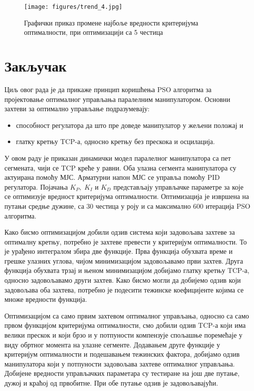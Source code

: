 \documentclass[12pt]{article}
\begin{document}
\begin{figure}[H]
    \centering
    \texttt{[image: figures/trend\_4.jpg]}
    \caption{Графички приказ промене најбоље вредности критеријума оптималности, при оптимизацији са 5 честица}
    \label{fig:trend_4}
\end{figure}
\newpage

\section{Закључак}
Циљ овог рада је да прикаже принцип коришћења PSO алгоритма за пројектовање оптималног управљања паралелним манипулатором. Основни захтеви за оптимално управљање подразумевају:
\begin{itemize}
    \item способност регулатора да што пре доведе манипулатор у жељени положај и
    \item глатку кретњу TCP-а, односно кретњу без прескока и осцилација.
\end{itemize}

У овом раду је приказан динамички модел паралелног манипулатора са пет сегмената, чији се TCP креће у равни. Оба улазна сегмента манипулатора су актуирана помоћу МЈС. Арматурни напон МЈС се управља помоћу PID регулатора. Појачања $K_P, \; K_I $ и $ K_D$ представљају управљачке параметре за које се оптимизује вредност критеријума оптималности. Оптимизација је извршена на путањи средње дужине, са 30 честица у роју и са максимално 600 итерација PSO алгоритма.

Како бисмо оптимизацијом добили одзив система који задовољава захтеве за оптималну кретњу, потребно је захтеве превести у критеријум оптималности. То је урађено интегралом збира две функције. Прва функција обухвата време и грешке улазних углова, чијом минимизацијом задовољавамо први захтев. Друга функција обухвата трзај и њеном минимизацијом добијамо глатку кретњу TCP-а, односно задовољавамо други захтев. Како бисмо могли да добијемо одзив који задовољава оба захтева, потребно је подесити тежинске коефицијенте којима се множе вредности функција.

Оптимизацијом са само првим захтевом оптималног управљања, односно са само првом функцијом критеријума оптималности, смо добили одзив TCP-а који има велики прескок и који брзо и у потпуности компензује спољашње поремећаје у виду обртног момента на улазне сегменте. Додавањем друге функције у критеријум оптималности и подешавањем тежинских фактора, добијамо одзив манипулатора који у потпуности задовољава захтеве оптималног управљања.
Добијене вредности управљачких параметара су тестиране на још две путање, дужој и краћој од првобитне. При обе путање одзив је задовољавајући.
\end{document}
